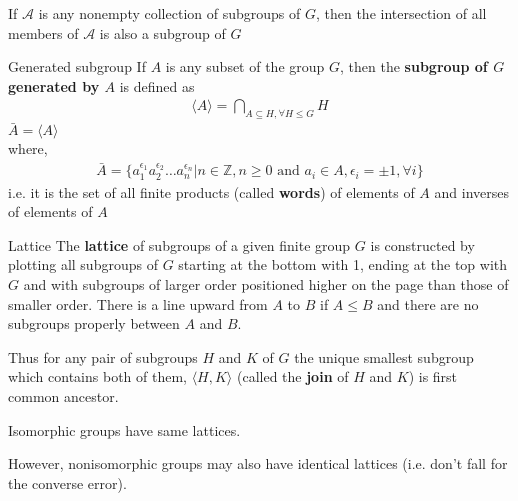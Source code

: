 \documentclass[titlepage, 12pt]{article}
\begin{document}
\begin{proposition}{}{}
    If $\mathcal{A}$ is any nonempty collection of subgroups of $G$, then
        the intersection of all members of $\mathcal{A}$ is also a subgroup of
        $G$
\end{proposition}
\begin{definition}{Generated subgroup}{}
    If $A$ is any subset of the group $G$, then the \textbf{subgroup of
        $G$ generated by $A$} is defined as
        \begin{gather*}
            \langle A\rangle = \bigcap_{A\subseteq H,\forall H\le G}H
        \end{gather*}
    $\bar{A} = \langle A\rangle$\\
        where,
        \begin{gather*}
            \bar{A} = \{a_1^{\epsilon_1}a_2^{\epsilon_2}\dots
                a_n^{\epsilon_n}|n\in\mathbb{Z}, n\ge 0\textrm{ and } a_i\in A,
            \epsilon_i = \pm 1, \forall i\}
        \end{gather*}
        i.e. it is the set of all finite products (called \textbf{words}) of
        elements of $A$ and inverses of elements of $A$
\end{definition}
\begin{definition}{Lattice}{}
    The \textbf{lattice} of subgroups of a given finite group $G$ is constructed
    by plotting all subgroups of $G$ starting at the bottom with 1, ending at
    the top with $G$ and with subgroups of larger order positioned higher on the
    page than those of smaller order. There is a line upward from $A$ to $B$ if
    $A\le B$ and there are no subgroups properly between $A$ and $B$.
\end{definition}
Thus for any pair of subgroups $H$ and $K$ of $G$ the unique smallest subgroup
which contains both of them, $\langle H, K\rangle$ (called the \textbf{join} of
$H$ and $K$) is first common ancestor.
\begin{proposition}{}{}
    Isomorphic groups have same lattices.
\end{proposition}
However, nonisomorphic groups may also have identical lattices (i.e. don't fall
for the converse error).
\end{document}
